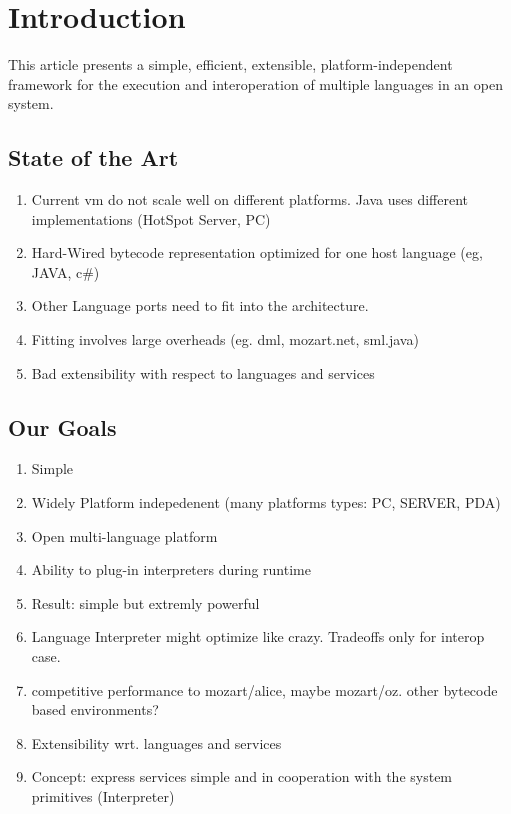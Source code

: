 \section{Introduction}
This article presents a
simple, efficient, extensible, platform-independent
framework for the execution and interoperation of multiple languages
in an open system.
\subsection{State of the Art}
\begin{enumerate}
\item Current vm do not scale well on different platforms. Java uses
different implementations (HotSpot Server, PC)
\item Hard-Wired bytecode representation
optimized for one host language (eg, JAVA, c\#)
\item Other Language ports need to fit into the architecture.
\item Fitting involves large overheads (eg. dml, mozart.net, sml.java)
\item Bad extensibility with respect to languages and services
\end{enumerate}
\subsection{Our Goals}
\begin{enumerate}
\item Simple
\item Widely Platform indepedenent (many platforms types: PC, SERVER, PDA)
\item Open multi-language platform
\item Ability to plug-in interpreters during runtime
\item Result: simple but extremly powerful
\item Language Interpreter might optimize like crazy. Tradeoffs only for
interop case.
\item competitive performance to mozart/alice, maybe mozart/oz. other bytecode
based environments?
\item Extensibility wrt. languages and services
\item Concept: express services simple and in cooperation with the system
primitives (Interpreter)
\end{enumerate}


